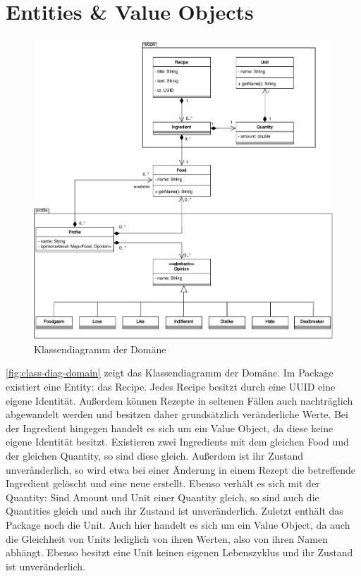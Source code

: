 \section{Entities \& Value Objects}

\begin{figure}[ht!]
    \includegraphics[width=0.98\columnwidth]{../diagrams/entity_uml.pdf}
    \caption{Klassendiagramm der Domäne}
    \label{fig:class-diag-domain}
\end{figure}

\autoref{fig:class-diag-domain} zeigt das Klassendiagramm der Domäne. Im Package  existiert eine Entity: das Recipe. Jedes Recipe besitzt durch eine UUID eine eigene Identität. Außerdem können Rezepte in seltenen Fällen auch nachträglich abgewandelt werden und besitzen daher grundsätzlich veränderliche Werte. Bei der Ingredient hingegen handelt es sich um ein Value Object, da diese keine eigene Identität besitzt. Existieren zwei Ingredients mit dem gleichen Food und der gleichen Quantity, so sind diese gleich. Außerdem ist ihr Zustand unveränderlich, so wird etwa bei einer Änderung in einem Rezept die betreffende Ingredient gelöscht und eine neue erstellt. Ebenso verhält es sich mit der Quantity: Sind Amount und Unit einer Quantity gleich, so sind auch die Quantities gleich und auch ihr Zustand ist unveränderlich. Zuletzt enthält das Package noch die Unit. Auch hier handelt es sich um ein Value Object, da auch die Gleichheit von Units lediglich von ihren Werten, also von ihren Namen abhängt. Ebenso besitzt eine Unit keinen eigenen Lebenszyklus und ihr Zustand ist unveränderlich.

